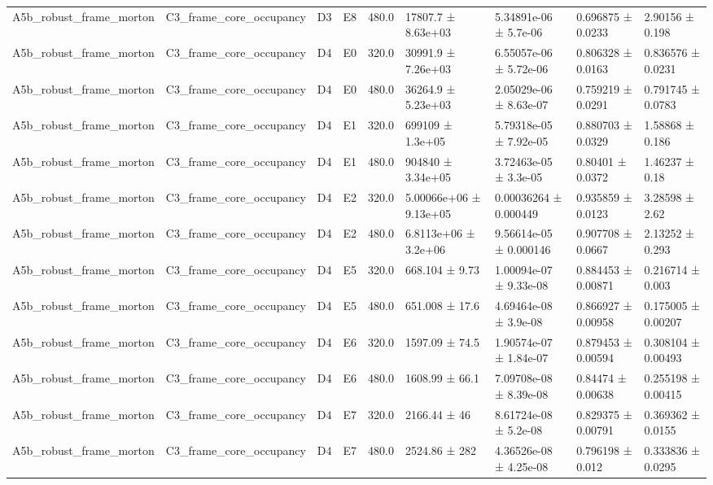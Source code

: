 \begin{table}
\begin{tabular}{lllllllll}
A5b\_robust\_frame\_morton & C3\_frame\_core\_occupancy & D3 & E8 & 480.0 & 17807.7 ± 8.63e+03 & 5.34891e-06 ± 5.7e-06 & 0.696875 ± 0.0233 & 2.90156 ± 0.198 \\
A5b\_robust\_frame\_morton & C3\_frame\_core\_occupancy & D4 & E0 & 320.0 & 30991.9 ± 7.26e+03 & 6.55057e-06 ± 5.72e-06 & 0.806328 ± 0.0163 & 0.836576 ± 0.0231 \\
A5b\_robust\_frame\_morton & C3\_frame\_core\_occupancy & D4 & E0 & 480.0 & 36264.9 ± 5.23e+03 & 2.05029e-06 ± 8.63e-07 & 0.759219 ± 0.0291 & 0.791745 ± 0.0783 \\
A5b\_robust\_frame\_morton & C3\_frame\_core\_occupancy & D4 & E1 & 320.0 & 699109 ± 1.3e+05 & 5.79318e-05 ± 7.92e-05 & 0.880703 ± 0.0329 & 1.58868 ± 0.186 \\
A5b\_robust\_frame\_morton & C3\_frame\_core\_occupancy & D4 & E1 & 480.0 & 904840 ± 3.34e+05 & 3.72463e-05 ± 3.3e-05 & 0.80401 ± 0.0372 & 1.46237 ± 0.18 \\
A5b\_robust\_frame\_morton & C3\_frame\_core\_occupancy & D4 & E2 & 320.0 & 5.00066e+06 ± 9.13e+05 & 0.00036264 ± 0.000449 & 0.935859 ± 0.0123 & 3.28598 ± 2.62 \\
A5b\_robust\_frame\_morton & C3\_frame\_core\_occupancy & D4 & E2 & 480.0 & 6.8113e+06 ± 3.2e+06 & 9.56614e-05 ± 0.000146 & 0.907708 ± 0.0667 & 2.13252 ± 0.293 \\
A5b\_robust\_frame\_morton & C3\_frame\_core\_occupancy & D4 & E5 & 320.0 & 668.104 ± 9.73 & 1.00094e-07 ± 9.33e-08 & 0.884453 ± 0.00871 & 0.216714 ± 0.003 \\
A5b\_robust\_frame\_morton & C3\_frame\_core\_occupancy & D4 & E5 & 480.0 & 651.008 ± 17.6 & 4.69464e-08 ± 3.9e-08 & 0.866927 ± 0.00958 & 0.175005 ± 0.00207 \\
A5b\_robust\_frame\_morton & C3\_frame\_core\_occupancy & D4 & E6 & 320.0 & 1597.09 ± 74.5 & 1.90574e-07 ± 1.84e-07 & 0.879453 ± 0.00594 & 0.308104 ± 0.00493 \\
A5b\_robust\_frame\_morton & C3\_frame\_core\_occupancy & D4 & E6 & 480.0 & 1608.99 ± 66.1 & 7.09708e-08 ± 8.39e-08 & 0.84474 ± 0.00638 & 0.255198 ± 0.00415 \\
A5b\_robust\_frame\_morton & C3\_frame\_core\_occupancy & D4 & E7 & 320.0 & 2166.44 ± 46 & 8.61724e-08 ± 5.2e-08 & 0.829375 ± 0.00791 & 0.369362 ± 0.0155 \\
A5b\_robust\_frame\_morton & C3\_frame\_core\_occupancy & D4 & E7 & 480.0 & 2524.86 ± 282 & 4.36526e-08 ± 4.25e-08 & 0.796198 ± 0.012 & 0.333836 ± 0.0295 \\

\end{tabular}
\end{table}
